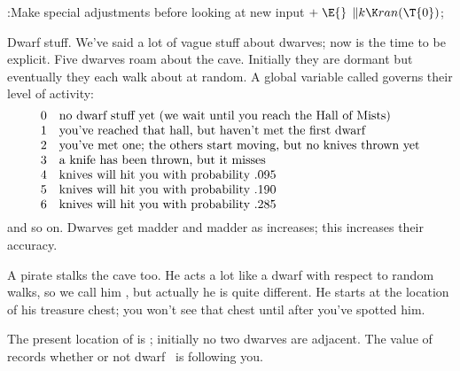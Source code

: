 \Y\B\4:Make special adjustments before looking at new input\X${}\mathrel+%
\E{}$\6
$\|k\K\\{ran}(\T{0}){}$;\par
\fi

Dwarf stuff. We've said a lot of vague stuff about
dwarves; now is the time
to be explicit. Five dwarves roam about the cave. Initially they are
dormant but eventually they each walk about at random.
A global variable called  governs their level of activity:
$$\vcenter{\halign{#\quad&#\hfil\cr
0&no dwarf stuff yet (we wait until you reach the Hall of Mists)\cr
1&you've reached that hall, but haven't met the first dwarf\cr
2&you've met one; the others start moving, but no knives thrown yet\cr
3&a knife has been thrown, but it misses\cr
4&knives will hit you with probability .095\cr
5&knives will hit you with probability .190\cr
6&knives will hit you with probability .285\cr}}$$
and so on. Dwarves get madder and madder as  increases; this
increases their accuracy.

A pirate stalks the cave too. He acts a lot like a dwarf with respect to
random walks, so we call him , but actually he is quite
different.
He starts at the location of his treasure chest; you won't see that chest
until after you've spotted him.

The present location of  is ; initially no
two
dwarves are adjacent. The value of
 records whether or not dwarf~ is following you.

